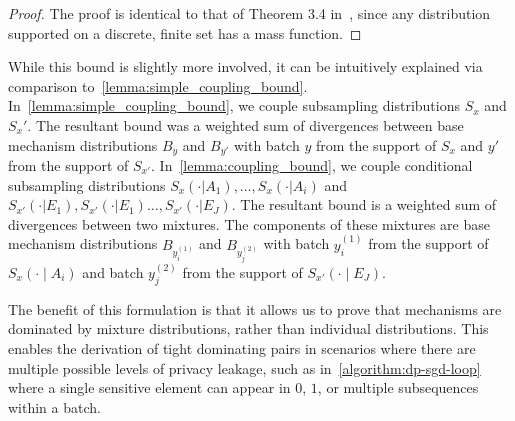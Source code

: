 \begin{proof}
    The proof is identical to that of Theorem 3.4 in~\cite{schuchardt2024unified}, since any distribution supported on a discrete, finite set has a mass function.
\end{proof}
While this bound is slightly more involved, it can be intuitively explained via comparison to~\cref{lemma:simple_coupling_bound}.
In~\cref{lemma:simple_coupling_bound}, we couple subsampling distributions $S_x$ and $S_x'$. The resultant bound was a weighted sum of  divergences between base mechanism distributions $B_y$ and $B_{y'}$ with batch $y$ from the support of $S_x$ and $y'$ from the support of $S_{x'}$.
In~\cref{lemma:coupling_bound}, we couple conditional subsampling distributions $S_x(\cdot | A_1), \dots, S_x(\cdot | A_i)$ and $S_{x'}(\cdot | E_1), S_{x'}(\cdot | E_1) \dots, S_{x'}(\cdot | E_J)$. The resultant bound is a weighted sum of divergences between two mixtures.
The components of these mixtures are base mechanism distributions $B_{y^{(1)}_i}$ and $B_{y^{(2)}_j}$ with batch $y^{(1)}_i$ from the support of $S_x(\cdot \mid A_i)$ and batch $y^{(2)}_j$ from the support of $S_{x'}(\cdot \mid E_J)$.

The benefit of this formulation is that it allows us to prove that mechanisms are dominated by mixture distributions, rather than individual distributions. This enables the derivation of tight dominating pairs in scenarios where there are multiple possible levels of privacy leakage, such as in~\cref{algorithm:dp-sgd-loop} where a single sensitive element can appear in $0$, $1$, or multiple subsequences within a batch.

